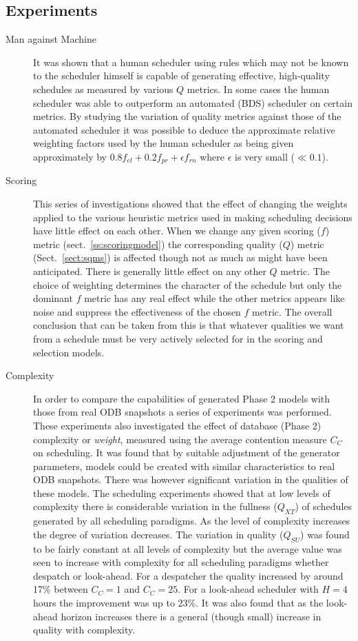 \subsection{Experiments}

\begin{description}
\item[Man against Machine]
It was shown that a human scheduler using rules which may not be known to the scheduler himself is capable of generating effective, high-quality schedules as measured by various $Q$ metrics. In some cases the human scheduler was able to outperform an automated (BDS) scheduler on certain metrics. By studying the variation of quality metrics against those of the automated scheduler it was possible to deduce the approximate relative weighting factors used by the human scheduler as being given approximately by $0.8 f_{el} + 0.2 f_{pr}+ \epsilon f_{rn}$ where $\epsilon$ is very small ($\ll 0.1$).

 \item[Scoring]
 This series of investigations showed that the effect of changing the weights applied to the various heuristic metrics used in making scheduling decisions have little effect on each other. When we change any given scoring ($f$) metric (sect.~\ref{ss:scoringmodel}) the corresponding quality ($Q$) metric (Sect.~\ref{sect:sqms}) is affected though not as much as might have been anticipated. There is generally little effect on any other $Q$ metric. The choice of weighting determines the character of the schedule but only the dominant $f$ metric has any real effect while the other metrics appears like noise and suppress the effectiveness of the chosen $f$ metric. The overall conclusion that can be taken from this is that whatever qualities we want from a schedule must be very actively selected for in the scoring and selection models. 
 
\item[Complexity]
 In order to compare the capabilities of generated Phase 2 models with those from real ODB snapshots a series of experiments was performed. These experiments also investigated the effect of database (Phase 2) complexity or \emph{weight}, measured using the average contention measure $C_C$ on scheduling. It was found that by suitable adjustment of the generator parameters, models could be created with similar characteristics to real ODB snapshots. There was however significant variation in the qualities of these models. The scheduling experiments showed that at low levels of complexity there is considerable variation in the fullness ($Q_{XT}$) of schedules generated by all scheduling paradigms. As the level of complexity increases the degree of variation decreases. The variation in quality ($Q_{SU}$) was found to be fairly constant at all levels of complexity but the average value was seen to increase with complexity for all scheduling paradigms whether despatch or look-ahead. For a despatcher the quality increased by around 17\% between $C_C = 1$ and $C_C = 25$. For a look-ahead scheduler with $H=4$ hours the improvement was up to 23\%. It was also found that as the look-ahead horizon increases there is a general (though small) increase in quality with complexity. 


\end{description}

